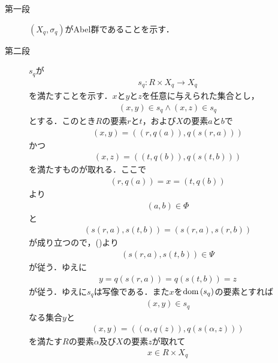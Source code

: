 	\begin{sketch}\mbox{}
		\begin{description}
			\item[第一段] $\left(X_q,\sigma_q\right)$がAbel群であることを示す．
			
			\item[第二段] $s_q$が 
				\begin{align}
					s_q:R \times X_q \longrightarrow X_q
				\end{align}
				を満たすことを示す．$x$と$y$と$z$を任意に与えられた集合とし，
				\begin{align}
					(x,y) \in s_q \wedge (x,z) \in s_q
				\end{align}
				とする．このとき$R$の要素$r$と$t$，および$X$の要素$a$と$b$で
				\begin{align}
					(x,y) = \left((r,q(a)),q(s(r,a))\right)
				\end{align}
				かつ
				\begin{align}
					(x,z) = \left((t,q(b)),q(s(t,b))\right)
				\end{align}
				を満たすものが取れる．ここで
				\begin{align}
					(r,q(a)) = x = (t,q(b))
				\end{align}
				より
				\begin{align}
					(a,b) \in \Phi
				\end{align}
				と
				\begin{align}
					\left(s(r,a), s(t,b)\right) = \left(s(r,a), s(r,b)\right) 
				\end{align}
				が成り立つので，()より
				\begin{align}
					\left(s(r,a), s(t,b)\right) \in \Psi
				\end{align}
				が従う．ゆえに
				\begin{align}
					y = q(s(r,a)) = q(s(t,b)) = z
				\end{align}
				が従う．ゆえに$s_q$は写像である．また$x$を$\operatorname*{dom} \left(s_q\right)$の要素とすれば
				\begin{align}
					(x,y) \in s_q
				\end{align}
				なる集合$y$と
				\begin{align}
					(x,y) = \left(\left(\alpha,q(z)\right),q\left(s(\alpha,z)\right)\right)
				\end{align}
				を満たす$R$の要素$\alpha$及び$X$の要素$z$が取れて
				\begin{align}
					x \in R \times X_q
				\end{align}

\end{description}
\end{sketch}
